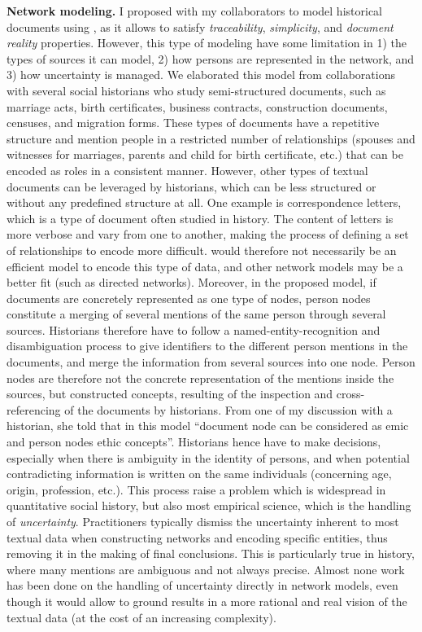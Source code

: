 \noindent\textbf{Network modeling.} I proposed with my collaborators to model historical documents using \modelplural, as it allows to satisfy \emph{traceability}, \emph{simplicity}, and \emph{document reality} properties. However, this type of modeling have some limitation in 1) the types of sources it can model, 2) how persons are represented in the network, and 3) how uncertainty is managed.
We elaborated this model from collaborations with several social historians who study semi-structured documents, such as marriage acts, birth certificates, business contracts, construction documents, censuses, and migration forms.
These types of documents have a repetitive structure and mention people in a restricted number of relationships (spouses and witnesses for marriages, parents and child for birth certificate, etc.) that can be encoded as roles in a consistent manner.
However, other types of textual documents can be leveraged by historians, which can be less structured or without any predefined structure at all.
One example is correspondence letters, which is a type of document often studied in history\cite{rollingerCicerosSupplicatioUnd2017, edelsteinHistoricalResearchDigital2017}.
The content of letters is more verbose and vary from one to another, making the process of defining a set of relationships to encode more difficult.
\modelplural would therefore not necessarily be an efficient model to encode this type of data, and other network models may be a better fit (such as directed networks).
Moreover, in the proposed model, if documents are concretely represented as one type of nodes, person nodes constitute a merging of several mentions of the same person through several sources.
Historians therefore have to follow a named-entity-recognition and disambiguation process to give identifiers to the different person mentions in the documents, and merge the information from several sources into one node.
Person nodes are therefore not the concrete representation of the mentions inside the sources, but constructed concepts, resulting of the inspection and cross-referencing of the documents by historians.
From one of my discussion with a historian, she told that in this model ``document node can be considered as emic and person nodes ethic concepts''\cite{headlandEmicsEticsInsider1990}.
Historians hence have to make decisions, especially when there is ambiguity in the identity of persons, and when potential contradicting information is written on the same individuals (concerning age, origin, profession, etc.).
This process raise a problem which is widespread in quantitative social history, but also most empirical science, which is the handling of \emph{uncertainty}.
Practitioners typically dismiss the uncertainty inherent to most textual data when constructing networks and encoding specific entities, thus removing it in the making of final conclusions.
This is particularly true in history, where many mentions are ambiguous and not always precise\cite{dufournaudRechercheEmpiriqueHistoire2015}.
Almost none work has been done on the handling of uncertainty directly in network models\cite{adarManagingUncertaintySocial}, even though it would allow to ground results in a more rational and real vision of the textual data (at the cost of an increasing complexity).

